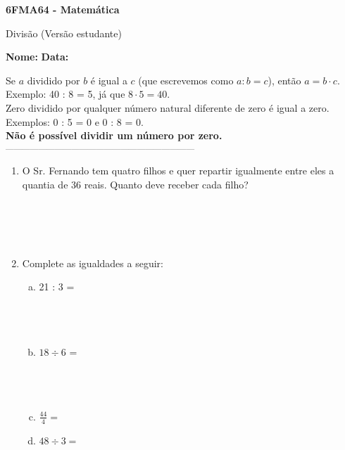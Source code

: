 \documentclass[a4paper,14pt]{article}
\begin{document}
	
	\noindent\textbf{6FMA64 - Matemática} 
	
	\begin{center}Divisão (Versão estudante)
	\end{center}
	
	\noindent\textbf{Nome:} \underline{\hspace{10cm}}
	\noindent\textbf{Data:} \underline{\hspace{4cm}}
	
	\begin{multicols}{2}
    		\noindent Se $a$ dividido por $b$ é igual a $c$ (que escrevemos como $a : b = c$), então $a = b \cdot c$. \\
    		Exemplo: 40 : 8 = 5, já que $8 \cdot 5 = 40$. \\
    		Zero dividido por qualquer número natural diferente de zero é igual a zero. \\
    		Exemplos: 0 : 5 = 0 e 0 : 8 = 0. \\
    		\textbf{Não é possível dividir um número por zero.} \\
    		\textsubscript{---------------------------------------------------------------------}
    		\begin{enumerate}
    			\item O Sr. Fernando tem quatro filhos e quer repartir igualmente entre eles a quantia de 36 reais. Quanto deve receber cada filho? \\\\\\\\\\
    			\item Complete as igualdades a seguir:
    			\begin{enumerate}[a)]
    				\item 21 : 3 = \\\\\\\\
    				\item $18 \div 6$ = \\\\\\\\
    				\item $\frac{44}{4} = $ \\
    				\item $48 \div 3 = $ \\\\\\\\

\end{enumerate}
\end{enumerate}
\end{multicols}
\end{document}
